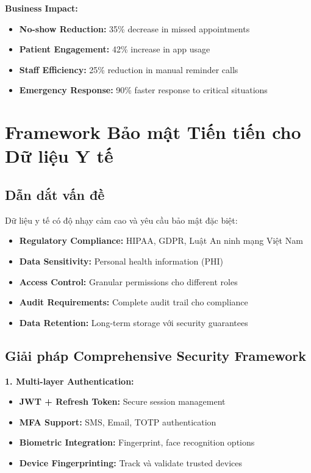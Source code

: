 \documentclass[../DoAn.tex]{subfiles}
\begin{document}
\textbf{Business Impact:}
\begin{itemize}
    \item \textbf{No-show Reduction:} 35\% decrease in missed appointments
    \item \textbf{Patient Engagement:} 42\% increase in app usage
    \item \textbf{Staff Efficiency:} 25\% reduction in manual reminder calls
    \item \textbf{Emergency Response:} 90\% faster response to critical situations
\end{itemize}

\section{Framework Bảo mật Tiến tiến cho Dữ liệu Y tế}
\label{section:5.5}

\subsection{Dẫn dắt vấn đề}

Dữ liệu y tế có độ nhạy cảm cao và yêu cầu bảo mật đặc biệt:
\begin{itemize}
    \item \textbf{Regulatory Compliance:} HIPAA, GDPR, Luật An ninh mạng Việt Nam
    \item \textbf{Data Sensitivity:} Personal health information (PHI)
    \item \textbf{Access Control:} Granular permissions cho different roles
    \item \textbf{Audit Requirements:} Complete audit trail cho compliance
    \item \textbf{Data Retention:} Long-term storage với security guarantees
\end{itemize}

\subsection{Giải pháp Comprehensive Security Framework}

\textbf{1. Multi-layer Authentication:}
\begin{itemize}
    \item \textbf{JWT + Refresh Token:} Secure session management
    \item \textbf{MFA Support:} SMS, Email, TOTP authentication
    \item \textbf{Biometric Integration:} Fingerprint, face recognition options
    \item \textbf{Device Fingerprinting:} Track và validate trusted devices
\end{itemize}
\end{document}
